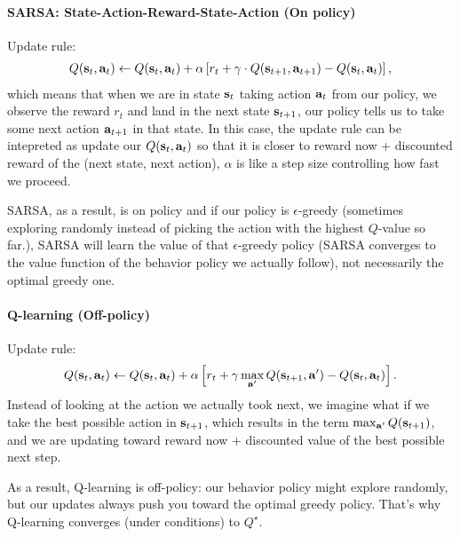 \documentclass[11pt]{article}  %
\begin{document}
\paragraph{SARSA: State-Action-Reward-State-Action (On policy)}
Update rule:
\begin{align*}
  Q(\mathbf{s}_t, \mathbf{a}_t) \leftarrow Q(\mathbf{s}_t, \mathbf{a}_t) + \alpha \left[ r_t + \gamma \cdot Q(\mathbf{s}_{t+1}, \mathbf{a}_{t+1}) - Q(\mathbf{s}_t, \mathbf{a}_t) \right],
\end{align*}
which means that when we are in state $\mathbf{s}_t$ taking action $\mathbf{a}_t$ from our policy, we observe the reward $r_t$ and land in the next state $\mathbf{s}_{t+1}$, our policy tells us to take some next action $\mathbf{a}_{t+1}$ in that state.
In this case, the update rule can be intepreted as update our $Q(\mathbf{s}_t, \mathbf{a}_t)$ so that it is closer to reward now + discounted reward of the (next state, next action), $\alpha$ is like a step size controlling how fast we proceed.

SARSA, as a result, is on policy and if our policy is $\epsilon$-greedy (sometimes exploring randomly instead of picking the action with the highest $Q$-value so far.), SARSA will learn the value of that $\epsilon$-greedy policy (SARSA converges to the value function of the behavior policy we actually follow), not necessarily the optimal greedy one.

\paragraph{Q-learning (Off-policy)}
Update rule:
\begin{align*}
  Q(\mathbf{s}_t, \mathbf{a}_t) \leftarrow Q(\mathbf{s}_t, \mathbf{a}_t) + \alpha\left[ r_t + \gamma\max_{\mathbf{a}^\prime} Q(\mathbf{s}_{t+1}, \mathbf{a}^\prime) - Q(\mathbf{s}_t, \mathbf{a}_t) \right].
\end{align*}
Instead of looking at the action we actually took next, we imagine what if we take the best possible action in $\mathbf{s}_{t+1}$, which results in the term $\max_{\mathbf{a}^\prime} Q(\mathbf{s}_{t+1})$, and we are updating toward reward now + discounted value of the best possible next step. 

As a result, Q-learning is off-policy: our behavior policy might explore randomly, but our updates always push you toward the optimal greedy policy. 
That's why Q-learning converges (under conditions) to $Q^\star$.
\end{document}
